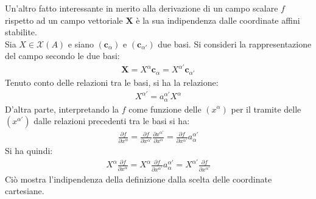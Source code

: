      {Un'altro fatto interessante in merito alla derivazione di un campo scalare $f$ rispetto ad un campo vettoriale $\mathbf{X}$ è la sua indipendenza dalle coordinate affini stabilite.\\
    Sia $X\in \mathcal{X}(A)$ e siano $(\mathbf{c}_\alpha)$ e $(\mathbf{c}_{\alpha'})$ due basi. Si consideri la rappresentazione del campo secondo le due basi:
    \begin{align*}
        \mathbf{X}=X^\alpha\mathbf{c}_\alpha =X^{\alpha'}\mathbf{c}_{\alpha'}
    \end{align*}
    Tenuto conto delle relazioni tra le basi, si ha la relazione:
    \begin{align*}
        X^{\alpha'}=a^{\alpha'}_\alpha X^\alpha
    \end{align*}
    D'altra parte, interpretando la $f$ come funzione delle $(x^\alpha)$ per il tramite delle $(x^{\alpha'})$ dalle relazioni precedenti tra le basi si ha:
    \begin{align*}
        \frac{\partial f}{\partial x^\alpha}=\frac{\partial f}{\partial x^{\alpha'}}\frac{\partial x^{\alpha'} }{\partial x^\alpha}=\frac{\partial f}{\partial x^{\alpha'}}a^{\alpha'}_\alpha
    \end{align*}
    Si ha quindi:
    \begin{align*}
        X^\alpha\frac{\partial f}{\partial x^\alpha}=X^\alpha\frac{\partial f}{\partial x^{\alpha'}}a^{\alpha'}_\alpha= X^{\alpha'}\frac{\partial f}{\partial x^{\alpha'}}
    \end{align*}
    Ciò mostra l'indipendenza della definizione dalla scelta delle coordinate cartesiane.}{}{}
